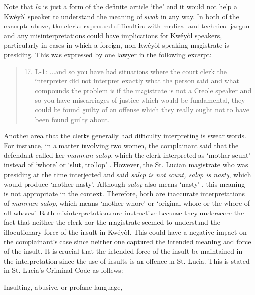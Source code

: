 \documentclass[output=paper,colorlinks,citecolor=brown]{langscibook}
\begin{document}
Note that \textit{la} is just a form of the definite article ‘the’ and it would not help a Kwéyòl speaker to understand the meaning of \textit{swab} in any way. In both of the excerpts above, the clerks expressed difficulties with medical and technical jargon and any misinterpretations could have implications for Kwéyòl speakers, particularly in cases in which a foreign, non-Kwéyòl speaking magistrate is presiding. This was expressed by one lawyer in the following excerpt:

\begin{quote}
    \begin{enumerate}
\setcounter{enumi}{16}    
        \item L-1: ...and so you have had situations where the court clerk the interpreter did not interpret exactly what the person said and what compounds the problem is if the magistrate is not a Creole speaker and so you have miscarriages of justice which would be fundamental, they could be found guilty of an offense which they really ought not to have been found guilty about.
    \end{enumerate}
\end{quote}

Another area that the clerks generally had difficulty interpreting is swear words. For instance, in a matter involving two women, the complainant said that the defendant called her \textit{manman salop}, which the clerk interpreted as ‘mother scunt’ instead of ‘whore’ or ‘slut, trollop’ \citep{Mondesir1992}. However, the St. Lucian magistrate who was presiding at the time interjected and said \textit{salop is not scunt, salop is nasty}, which would produce ‘mother nasty’. Although \textit{salop} also means ‘nasty’ \citep{Frank2001}, this meaning is not appropriate in the context. Therefore, both are inaccurate interpretations of \textit{manman salop}, which means ‘mother whore’ or ‘original whore or the whore of all whores’. Both misinterpretations are instructive because they underscore the fact that neither the clerk nor the magistrate seemed to understand the illocutionary force of the insult in Kwéyòl. This could have a negative impact on the complainant’s case since neither one captured the intended meaning and force of the insult. It is crucial that the intended force of the insult be maintained in the interpretation since the use of insults is an offence in St. Lucia. This is stated in St. Lucia’s Criminal Code as follows:

Insulting, abusive, or profane language, 
\end{document}
